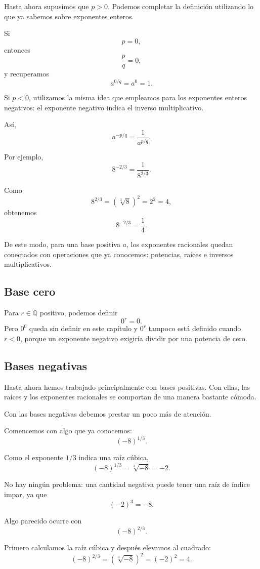 Hasta ahora supusimos que \(p>0\). Podemos completar la definición utilizando lo que ya sabemos sobre exponentes enteros.

Si
\[
p=0,
\]
entonces
\[
\frac pq=0,
\]
y recuperamos
\[
a^{0/q}=a^0=1.
\]

Si \(p<0\), utilizamos la misma idea que empleamos para los exponentes enteros negativos: el exponente negativo indica el inverso multiplicativo.

Así,
\[
a^{-p/q}
=
\frac{1}{a^{p/q}}.
\]

Por ejemplo,
\[
8^{-2/3}
=
\frac{1}{8^{2/3}}.
\]

Como
\[
8^{2/3}
=
\left(\sqrt[3]{8}\right)^2
=
2^2
=
4,
\]
obtenemos
\[
8^{-2/3}
=
\frac14.
\]

De este modo, para una base positiva \(a\), los exponentes racionales quedan conectados con operaciones que ya conocemos: potencias, raíces e inversos multiplicativos.

\subsection{Base cero}

Para \(r\in\mathbb Q\) positivo, podemos definir
\[
0^r=0.
\]
Pero \(0^0\) queda sin definir en este capítulo y \(0^r\) tampoco está definido cuando \(r<0\), porque un exponente negativo exigiría dividir por una potencia de cero.

\subsection{Bases negativas}

Hasta ahora hemos trabajado principalmente con bases positivas. Con ellas, las raíces y los exponentes racionales se comportan de una manera bastante cómoda.

Con las bases negativas debemos prestar un poco más de atención.

Comencemos con algo que ya conocemos:
\[
(-8)^{1/3}.
\]

Como el exponente \(1/3\) indica una raíz cúbica,
\[
(-8)^{1/3}
=
\sqrt[3]{-8}
=
-2.
\]

No hay ningún problema: una cantidad negativa puede tener una raíz de índice impar, ya que
\[
(-2)^3=-8.
\]

Algo parecido ocurre con
\[
(-8)^{2/3}.
\]

Primero calculamos la raíz cúbica y después elevamos al cuadrado:
\[
(-8)^{2/3}
=
\left(\sqrt[3]{-8}\right)^2
=
(-2)^2
=
4.
\]

